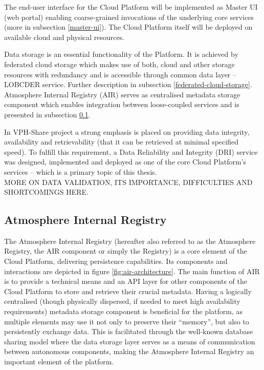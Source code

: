 The end-user interface for the Cloud Platform will be implemented as Master UI
(web portal) enabling coarse-grained invocations of the underlying
core services (more in subsection \ref{master-ui}). The Cloud Platform itself
will be deployed on available cloud and physical resources.

Data storage is an essential functionality of the Platform. It is achieved by
federated cloud storage which makes use of both, cloud and other storage
resources with redundancy and is accessible through common data layer --
LOBCDER service. Further description in subsection 
\ref{federated-cloud-storage}. Atmosphere Internal Registry (AIR) serves as
centralised metadata storage component which enables integration between 
loose-coupled services and is presented in subsection \ref{air}.

In VPH-Share project a strong emphasis is placed on providing data integrity,
availability and retrievability (that it can be retrieved at minimal specified
speed). To fulfill this requirement, a Data Reliability and Integrity (DRI)
service was designed, implemented and deployed as one of the core Cloud
Platform's services -- which is a primary topic of this thesis.\\

MORE ON DATA VALIDATION, ITS IMPORTANCE, DIFFICULTIES AND SHORTCOMINGS HERE.

		\subsection{Atmosphere Internal Registry}
		\label{air}
The Atmosphere Internal Registry (hereafter also referred to as the Atmosphere
Registry, the AIR component or simply the Registry) is a core element of the 
Cloud Platform, delivering persistence capabilities. Its components and
interactions are depicted in figure \ref{fig:air-architecture}. The main 
function of AIR is to provide a technical means and an API layer for other 
components of the Cloud Platform to store and retrieve their crucial metadata. Having 
a logically centralised (though physically dispersed, if needed to meet high
availability requirements) metadata storage component is beneficial for the 
platform, as multiple elements may use it not only to preserve their “memory”,
but also to persistently exchange data. 
This is facilitated through the well-known database sharing 
model where the data storage layer serves as a means of communication between
autonomous components, making the Atmosphere Internal Registry an important 
element of the platform.

